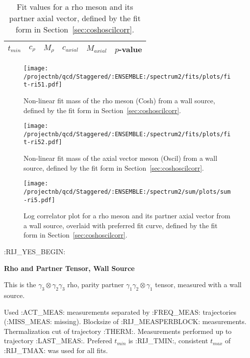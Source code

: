 \begin{table}[ht!]
\centering
\scriptsize
\begin{tabular}{|c|c|c|c|c|c|}
\hline
 $t_{min}$ & $c_{\rho}$ &  $M_{\rho}$ & $c_{axial}$ & $M_{axial}$ & $p$-value \\
\hline

\end{tabular}
\caption{Fit values for a rho meson and its partner axial vector, defined by the fit form in Section~\ref{sec:coshoscilcorr}.}
\end{table}

\begin{multicols}{2}
\begin{figure}[H]
\centering
\texttt{[image: /projectnb/qcd/Staggered/:ENSEMBLE:/spectrum2/fits/plots/fit-ri51.pdf]}
\caption{Non-linear fit mass of the rho meson (Cosh) from a wall source, defined by the fit form in Section~\ref{sec:coshoscilcorr}.}
\end{figure}
\columnbreak
\begin{figure}[H]
\centering
\texttt{[image: /projectnb/qcd/Staggered/:ENSEMBLE:/spectrum2/fits/plots/fit-ri52.pdf]}
\caption{Non-linear fit mass of the axial vector meson (Oscil) from a wall source, defined by the fit form in Section~\ref{sec:coshoscilcorr}.}
\end{figure}
\end{multicols}


\begin{figure}[H]
\centering
\texttt{[image: /projectnb/qcd/Staggered/:ENSEMBLE:/spectrum2/sum/plots/sum-ri5.pdf]}
\caption{Log correlator plot for a rho meson and its partner axial vector from a wall source, overlaid with preferred fit curve, defined by the fit form in Section~\ref{sec:coshoscilcorr}.}
\end{figure}

\clearpage

:RIJ_YES_BEGIN:
\centerline{\textbf{Rho and Partner Tensor, Wall Source}}

This is the $\gamma_3 \otimes \gamma_2 \gamma_3$ rho, parity partner $\gamma_1 \gamma_2 \otimes \gamma_1$ tensor, measured with a wall source.

{\small{Used :ACT_MEAS: measurements separated by :FREQ_MEAS: trajectories (:MISS_MEAS: missing). Blocksize of :RIJ_MEASPERBLOCK: measurements. Thermalization cut of trajectory :THERM:. Measurements performed up to trajectory :LAST_MEAS:. Prefered $t_{min}$ is :RIJ_TMIN:, consistent $t_{max}$ of :RIJ_TMAX: was used for all fits.}}


